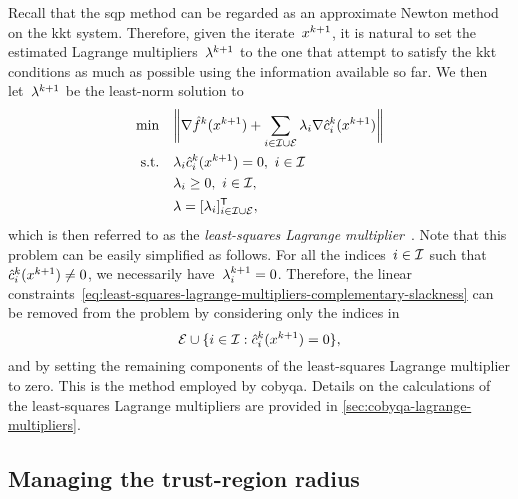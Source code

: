 Recall that the \gls{sqp} method can be regarded as an approximate Newton method on the \gls{kkt} system.
Therefore, given the iterate~$\iter[k + 1]$, it is natural to set the estimated Lagrange multipliers~$\lm[k + 1]$ to the one that attempt to satisfy the \gls{kkt} conditions as much as possible using the information available so far.
We then let~$\lm[k + 1]$ be the least-norm solution to
\begin{subequations}
    \begin{align}
        \min        & \quad \norm[\bigg]{\nabla \objm[k](\iter[k + 1]) + \sum_{i \in \iub \cup \ieq} \lm_i \nabla \conm[k]{i}(\iter[k + 1])}\\
        \text{s.t.} & \quad \lm_i \conm[k]{i}(\iter[k + 1]) = 0, ~ i \in \iub \label{eq:least-squares-lagrange-multipliers-complementary-slackness}\\
                    & \quad \lm_i \ge 0, ~ i \in \iub,\\
                    & \quad \lm = [\lm_i]_{i \in \iub \cup \ieq}^{\T},
    \end{align}
\end{subequations}
which is then referred to as the \emph{least-squares Lagrange multiplier}~\cite{Dussault_1995}.
Note that this problem can be easily simplified as follows.
For all the indices~$i \in \mathcal{I}$ such that~$\conm[k]{i}(\iter[k + 1]) \neq 0$, we necessarily have~$\lm[k + 1]_i = 0$.
Therefore, the linear constraints~\cref{eq:least-squares-lagrange-multipliers-complementary-slackness} can be removed from the problem by considering only the indices in
\begin{equation*}
    \ieq \cup \set{i \in \iub : \conm[k]{i}(\iter[k + 1]) = 0},
\end{equation*}
and by setting the remaining components of the least-squares Lagrange multiplier to zero.
This is the method employed by \gls{cobyqa}.
Details on the calculations of the least-squares Lagrange multipliers are provided in \cref{sec:cobyqa-lagrange-multipliers}.

\subsection{Managing the trust-region radius}
\label{subsec:managing-trust-region-radius}


